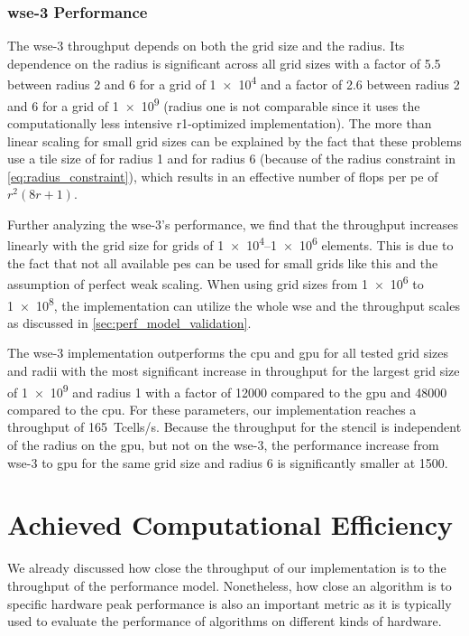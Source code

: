 \subsubsection{\ac{wse}-3 Performance}
The \ac{wse}-3 throughput depends on both the grid size and the radius. Its dependence on the radius is significant across all grid sizes with a factor of \num{5.5} between radius \num{2} and \num{6} for a grid of \num{1e4} and a factor of \num{2.6} between radius \num{2} and \num{6} for a grid of \num{1e9} (radius one is not comparable since it uses the computationally less intensive r1-optimized implementation).
The more than linear scaling for small grid sizes can be explained by the fact that these problems use a tile size of  for radius \num{1} and  for radius \num{6} (because of the radius constraint in \autoref{eq:radius_constraint}), which results in an effective number of \acp{flop} per \ac{pe} of $r^2(8r+1)$.

Further analyzing the \ac{wse}-3's performance, we find that the throughput increases linearly with the grid size for grids of \numrange{1e4}{1e6} elements. This is due to the fact that not all available \acp{pe} can be used for small grids like this and the assumption of perfect weak scaling. When using grid sizes from \num{1e6} to \num{1e8}, the implementation can utilize the whole \ac{wse} and the throughput scales as discussed in \autoref{sec:perf_model_validation}.

The \ac{wse}-3 implementation outperforms the \ac{cpu} and \ac{gpu} for all tested grid sizes and radii with the most significant increase in throughput for the largest grid size of \num{1e9} and radius \num{1} with a factor of \num{12000} compared to the \ac{gpu} and \num{48000} compared to the \ac{cpu}. For these parameters, our implementation reaches a throughput of \qty{165}{\tera cells/s}. Because the throughput for the stencil is independent of the radius on the \ac{gpu}, but not on the \ac{wse}-3, the performance increase from \ac{wse}-3 to \ac{gpu} for the same grid size and radius \num{6} is significantly smaller at \num{1500}.

\section{Achieved Computational Efficiency}
We already discussed how close the throughput of our implementation is to the throughput of the performance model.
Nonetheless, how close an algorithm is to specific hardware peak performance is also an important metric as it is typically used to evaluate the performance of algorithms on different kinds of hardware.

